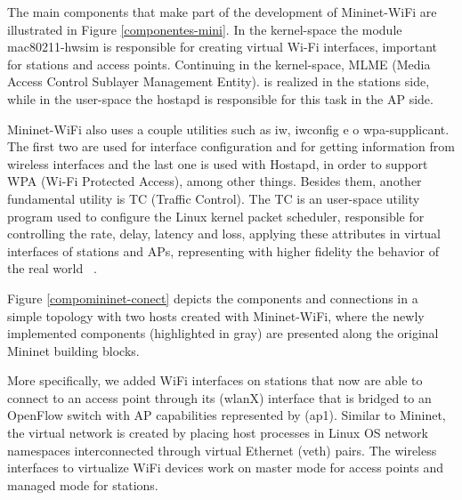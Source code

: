 \documentclass[
  oneside,
  11pt, a4paper,
  footinclude=true,
  headinclude=true,
  cleardoublepage=empty
]{scrbook}
\begin{document}
The main components that make part of the development of Mininet-WiFi are illustrated in Figure \ref{componentes-mini}. In the kernel-space the module mac80211-hwsim is responsible for creating virtual Wi-Fi interfaces, important for stations and access points. Continuing in the kernel-space, MLME (Media Access Control Sublayer Management Entity). is realized in the stations side, while in the user-space the hostapd is responsible for this task in the AP side.\par
Mininet-WiFi also uses a couple utilities such as iw, iwconfig e o wpa-supplicant. The first two are used for interface configuration and for getting information from wireless interfaces and the last one is used with Hostapd, in order to support WPA (Wi-Fi Protected Access), among other things. Besides them, another fundamental utility is TC (Traffic Control). The TC is an user-space utility program used to configure the Linux kernel packet scheduler, responsible for controlling the rate, delay, latency and loss, applying these attributes in virtual interfaces of stations and APs, representing with higher fidelity the behavior of the real world ~\cite{mininet-wifibook}.\par
Figure \ref{compomininet-conect} depicts the components and connections in a simple topology with two hosts created with Mininet-WiFi, where the newly implemented components (highlighted in gray) are presented along the original Mininet building blocks.\par
More specifically, we added WiFi interfaces on stations that now are able to connect to an access point through its (wlanX) interface that is bridged to an OpenFlow switch with AP capabilities represented by (ap1). Similar to Mininet, the virtual network is created by placing host processes in Linux OS network namespaces interconnected through virtual Ethernet (veth) pairs. The wireless interfaces to virtualize WiFi devices work on master mode for access points and managed mode for stations.\par
\end{document}
